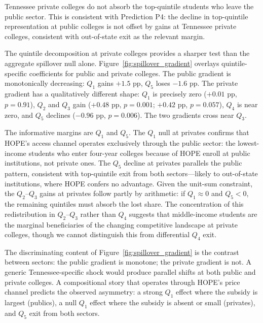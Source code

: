 Tennessee private colleges do not absorb the top-quintile students who
leave the public sector. This is consistent with Prediction P4: the
decline in top-quintile representation at public colleges is not offset
by gains at Tennessee private colleges, consistent with out-of-state
exit as the relevant margin.

The quintile decomposition at private colleges provides a sharper test
than the aggregate spillover null alone.
Figure~\ref{fig:spillover_gradient} overlays quintile-specific
coefficients for public and private colleges. The public gradient is
monotonically decreasing: $Q_1$ gains $+1.5$ pp, $Q_5$ loses $-1.6$
pp. The private gradient has a qualitatively different shape: $Q_1$ is
precisely zero ($+0.01$ pp, $p = 0.91$), $Q_2$ and $Q_3$ gain
($+0.48$ pp, $p = 0.001$; $+0.42$ pp, $p = 0.057$), $Q_4$ is near
zero, and $Q_5$ declines ($-0.96$ pp, $p = 0.006$). The two gradients
cross near $Q_3$.

The informative margins are $Q_1$ and $Q_5$. The $Q_1$ null at
privates confirms that HOPE's access channel operates exclusively
through the public sector: the lowest-income students who enter
four-year colleges because of HOPE enroll at public institutions, not
private ones. The $Q_5$ decline at privates parallels the public
pattern, consistent with top-quintile exit from both sectors---likely
to out-of-state institutions, where HOPE confers no advantage. Given
the unit-sum constraint, the $Q_2$--$Q_3$ gains at privates follow
partly by arithmetic: if $Q_1 \approx 0$ and $Q_5 < 0$, the
remaining quintiles must absorb the lost share. The concentration of
this redistribution in $Q_2$--$Q_3$ rather than $Q_4$ suggests that
middle-income students are the marginal beneficiaries of the changing
competitive landscape at private colleges, though we cannot
distinguish this from differential $Q_4$ exit.

The discriminating content of Figure~\ref{fig:spillover_gradient} is
the contrast between sectors: the public gradient is monotone; the
private gradient is not. A generic Tennessee-specific shock would
produce parallel shifts at both public and private colleges. A
compositional story that operates through HOPE's price channel
predicts the observed asymmetry: a strong $Q_1$ effect where the
subsidy is largest (publics), a null $Q_1$ effect where the subsidy is
absent or small (privates), and $Q_5$ exit from both sectors.

